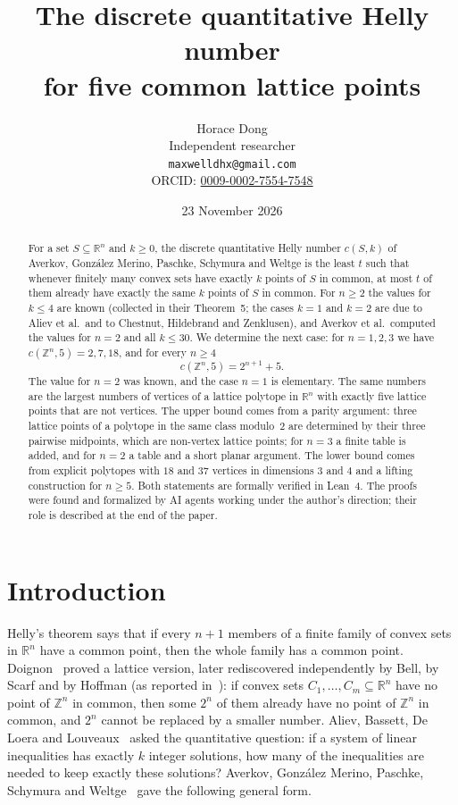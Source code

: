 \documentclass[11pt]{article}
\title{The discrete quantitative Helly number\\ for five common lattice points}
\author{Horace Dong\\ \small Independent researcher\\
\small\texttt{maxwelldhx@gmail.com}\\
\small ORCID: \href{https://orcid.org/0009-0002-7554-7548}{0009-0002-7554-7548}}
\date{23 November 2026}
\theoremstyle{definition}
\theoremstyle{remark}
\newcommand{\Z}{\mathbb Z}
\newcommand{\R}{\mathbb R}
\begin{document}
\sloppy
\maketitle

\begin{abstract}
For a set $S\subseteq\R^n$ and $k\ge0$, the discrete quantitative Helly
number $c(S,k)$ of Averkov, Gonz\'alez Merino, Paschke, Schymura and Weltge is
the least $t$ such that whenever finitely many convex sets have exactly $k$
points of $S$ in common, at most $t$ of them already have exactly the same $k$
points of $S$ in common. For $n\ge2$ the values for $k\le4$ are known
(collected in their Theorem~5; the cases $k=1$ and $k=2$ are due to Aliev et
al.\ and to Chestnut, Hildebrand and Zenklusen), and Averkov et al.\ computed
the values for $n=2$ and all $k\le30$. We determine the next case: for
$n=1,2,3$ we have $c(\Z^n,5)=2,7,18$, and for every $n\ge4$
\[
c(\Z^n,5)=2^{n+1}+5 .
\]
The value for $n=2$ was known, and the case $n=1$ is elementary. The same numbers are the largest numbers of
vertices of a lattice polytope in $\R^n$ with exactly five lattice points that
are not vertices. The upper bound comes from a parity argument: three lattice
points of a polytope in the same class modulo~$2$ are determined by their three
pairwise midpoints, which are non-vertex lattice points; for $n=3$ a finite
table is added, and for $n=2$ a table and a short planar argument. The lower bound comes from
explicit polytopes with $18$ and $37$ vertices in dimensions $3$ and $4$ and a
lifting construction for $n\ge5$. Both statements are formally verified in
Lean~4. The proofs were found and formalized by AI agents working under the
author's direction; their role is described at the end of the paper.
\end{abstract}

\section{Introduction}\label{sec:intro}

Helly's theorem says that if every $n+1$ members of a finite family of convex
sets in $\R^n$ have a common point, then the whole family has a common point.
Doignon~\cite{doi} proved a lattice version, later rediscovered independently
by Bell, by Scarf and by Hoffman (as reported in~\cite{agm}): if convex sets $C_1,\dots,C_m\subseteq\R^n$
have no point of $\Z^n$ in common, then some $2^n$ of them already have no
point of $\Z^n$ in common, and $2^n$ cannot be replaced by a smaller number.
Aliev, Bassett, De Loera and Louveaux~\cite{abdl} asked the quantitative
question: if a system of linear inequalities has exactly $k$ integer
solutions, how many of the inequalities are needed to keep exactly these
solutions? Averkov, Gonz\'alez Merino, Paschke, Schymura and
Weltge~\cite{agm} gave the following general form.
\end{document}
